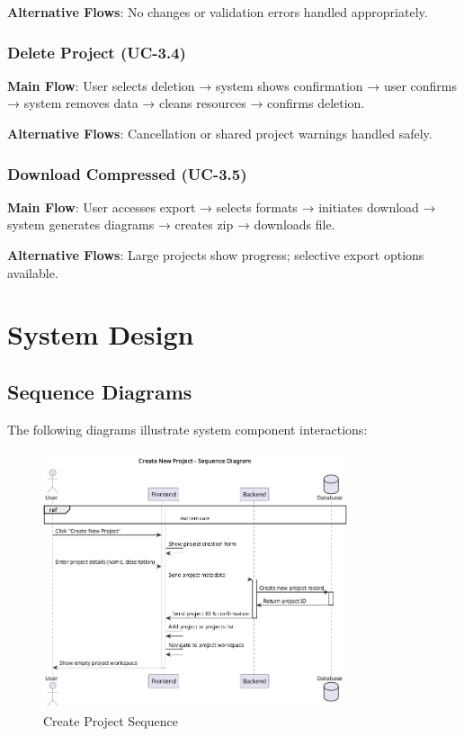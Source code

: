 \textbf{Alternative Flows}: No changes or validation errors handled appropriately.

\subsubsection{Delete Project (UC-3.4)}
\textbf{Main Flow}: User selects deletion → system shows confirmation → user confirms → system removes data → cleans resources → confirms deletion.

\textbf{Alternative Flows}: Cancellation or shared project warnings handled safely.

\subsubsection{Download Compressed (UC-3.5)}
\textbf{Main Flow}: User accesses export → selects formats → initiates download → system generates diagrams → creates zip → downloads file.

\textbf{Alternative Flows}: Large projects show progress; selective export options available.

\section{System Design}

\subsection{Sequence Diagrams}

The following diagrams illustrate system component interactions:

\begin{figure}[H]
\centering
\includegraphics[width=0.8\textwidth]{conception/SprintIII/sequence_diagrams/sequence_projectManagement_3_1_CreateNewProject.png}
\caption{Create Project Sequence}
\label{fig:seq_create_project}
\end{figure}

